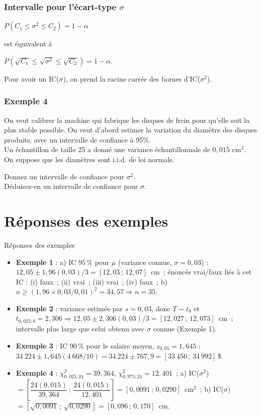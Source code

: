 \documentclass{BeamerTemplate}
\begin{document}
\begin{frame}[t]
 \frametitle{Intervalle pour l'écart-type $\sigma$}

  $P\left(C_1\le \sigma^2\le C_2\right)=1- \alpha $
  \bigskip

  est équivalent à
    \bigskip

  $P\left(\sqrt{C_1}\le \sqrt{\sigma^2}\le\sqrt{C_2}\right)=1 - \alpha $.
    \bigskip

  Pour avoir un IC($\sigma$), on prend la racine carrée des bornes d'IC($\sigma^2$).

\end{frame}

\begin{frame}[t]
 \frametitle{Exemple 4}

 {\small
 On veut calibrer la machine qui fabrique les disques de frein pour qu'elle soit la plus stable possible. On veut d'abord estimer la variation du diamètre des disques produits, avec un intervalle de confiance  à 95\%.\\

 Un échantillon de taille 25  a donné une variance échantillonnale de $0,015$ cm$^2$.  On suppose que les diamètres sont i.i.d. de loi normale.

 \vspace{2mm}
  Donnez un intervalle de confiance pour $\sigma^2$.\\
  Déduisez-en un intervalle de confiance pour $\sigma$.}

\end{frame}

\section{Réponses des exemples}

\begin{frame}[t]{Réponses des exemples}
\footnotesize
\begin{itemize}
\item \textbf{Exemple 1} : a) IC $95\,\%$ pour $\mu$ (variance connue, $\sigma=0{,}03$) : $12{,}05\pm1{,}96(0{,}03)/3=[12{,}03\,;\,12{,}07]$~cm~; énoncés vrai/faux liés à cet IC : (i) faux~; (ii) vrai~; (iii) vrai~; (iv) faux~; b) $n\ge(1{,}96\times0{,}03/0{,}01)^2=34{,}57\Rightarrow n=35$.
\item \textbf{Exemple 2} : variance estimée par $s=0{,}03$, donc $T\sim t_8$ et $t_{0,025;8}=2{,}306\Rightarrow12{,}05\pm2{,}306(0{,}03)/3=[12{,}027\,;\,12{,}073]$~cm~; intervalle plus large que celui obtenu avec $\sigma$ connue (Exemple 1).
\item \textbf{Exemple 3} : IC $90\,\%$ pour le salaire moyen, $z_{0,05}=1{,}645$ : $34~224\pm1{,}645(4~668/10)=34~224\pm767{,}9=[33~456\,;\,34~992]$\,\$.
\item \textbf{Exemple 4} : $\chi^2_{0,025;24}=39{,}364$, $\chi^2_{0,975;24}=12{,}401$~; a) IC($\sigma^2$) $=\left[\dfrac{24(0{,}015)}{39{,}364}\,;\,\dfrac{24(0{,}015)}{12{,}401}\right]=[0{,}0091\,;\,0{,}0290]$~cm$^2$~; b) IC($\sigma$) $=[\sqrt{0{,}0091}\,;\,\sqrt{0{,}0290}]=[0{,}096\,;\,0{,}170]$~cm.
\end{itemize}

\end{frame}
\end{document}
